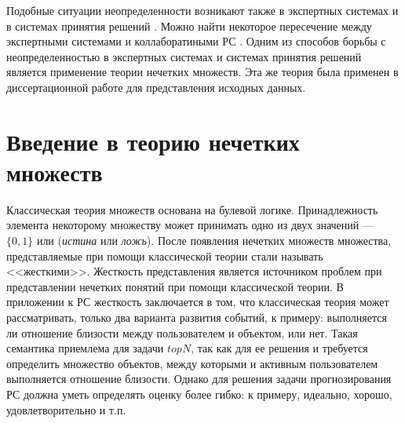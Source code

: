 Подобные ситуации неопределенности возникают также в экспертных
системах \cite{expert-systems} и в системах принятия решений \cite{set-theory}.
Можно найти некоторое пересечение между экспертными системами и
коллаборатиными РС \cite{cf-expert}. Одним из способов борьбы с
неопределенностью в экспертных системах и системах принятия решений
является применение теории нечетких множеств. Эта же теория была применен
в диссертационной работе для представления исходных данных.

\section{Введение в теорию нечетких множеств}
Классическая теория множеств основана на булевой логике.
Принадлежность элемента некоторому множеству может принимать одно
из двух значений --- $\{0,1\}$ или ({\it истина} или {\it ложь}).
После появления нечетких множеств множества, представляемые при помощи классической теории
стали называть <<жесткими>>. Жесткость представления является источником
проблем при представлении нечетких
понятий при помощи классической теории. В приложении к РС жесткость
заключается в том, что классическая теория может рассматривать,
только два варианта развития событий, к примеру: выполняется ли отношение
близости между пользователем и объектом, или нет.
Такая семантика приемлема для задачи $topN$, так как для ее решения
и требуется определить множество объектов, между которыми и активным
пользователем выполняется отношение близости.
Однако для решения задачи прогнозирования РС должна уметь определять
оценку более гибко: к примеру, идеально, хорошо, удовлетворительно и т.п.

